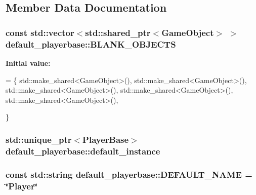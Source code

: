 \subsection{Member Data Documentation}
\hypertarget{classdefault__playerbase_a06e9be69d4ee621b71bfb2ab8b02aaa5}{
\subsubsection[{B\-L\-A\-N\-K\-\_\-\-O\-B\-J\-E\-C\-T\-S}]{\setlength{\rightskip}{0pt plus 5cm}const std\-::vector$<$std\-::shared\-\_\-ptr$<${\bf Game\-Object}$>$ $>$ default\-\_\-playerbase\-::\-B\-L\-A\-N\-K\-\_\-\-O\-B\-J\-E\-C\-T\-S\hspace{0.3cm}{\ttfamily [private]}}}\label{classdefault__playerbase_a06e9be69d4ee621b71bfb2ab8b02aaa5}
{\bfseries Initial value\-:}
\begin{DoxyCode}
= \{
        std::make\_shared<GameObject>(),
        std::make\_shared<GameObject>(),
        std::make\_shared<GameObject>(),
        std::make\_shared<GameObject>(),
        std::make\_shared<GameObject>(),

    \}
\end{DoxyCode}
\hypertarget{classdefault__playerbase_a703e1d8144130378036db93a04158bf1}{
\subsubsection[{default\-\_\-instance}]{\setlength{\rightskip}{0pt plus 5cm}std\-::unique\-\_\-ptr$<${\bf Player\-Base}$>$ default\-\_\-playerbase\-::default\-\_\-instance\hspace{0.3cm}{\ttfamily [private]}}}\label{classdefault__playerbase_a703e1d8144130378036db93a04158bf1}
\hypertarget{classdefault__playerbase_a765fd2269477fdbc4e9089fe6c289736}{
\subsubsection[{D\-E\-F\-A\-U\-L\-T\-\_\-\-N\-A\-M\-E}]{\setlength{\rightskip}{0pt plus 5cm}const std\-::string default\-\_\-playerbase\-::\-D\-E\-F\-A\-U\-L\-T\-\_\-\-N\-A\-M\-E = \char`\"{}Player\char`\"{}\hspace{0.3cm}{\ttfamily [private]}}}\label{classdefault__playerbase_a765fd2269477fdbc4e9089fe6c289736}
